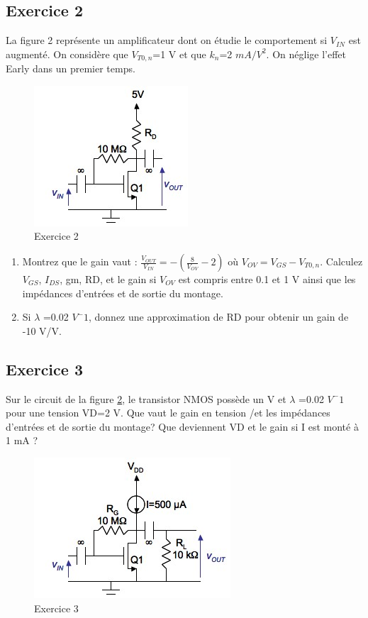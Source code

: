 \documentclass[paper=a4, fontsize=11pt]{article} %
\numberwithin{equation}{section} %
\numberwithin{figure}{section} %
\numberwithin{table}{section} %
\begin{document}
\subsection*{Exercice 2}
La figure 2 représente un amplificateur dont on étudie le comportement si $V_{IN}$ est augmenté. On considère que $V_{T0,n}$=1 V et que $k_n$=2 $mA/V^2$. On néglige l'effet Early dans un premier temps.
\begin{figure}[!htbp]
   \centering
   \includegraphics[]{figure/fig2-2.png}
   \caption{Exercice 2}
   \label{fig2-2}
\end{figure}
\begin{enumerate}
\item Montrez que le gain vaut : $\frac{V_{OUT}}{V_{IN}} = -\left(\frac{8}{V_{OV}}-2\right)$ où $V_{OV}=V_{GS}-V_{T0,n}$. Calculez $V_{GS}$, $I_{DS}$, gm, RD, et le gain si $V_{OV}$ est compris entre 0.1 et 1 V ainsi que les impédances d'entrées et de sortie du montage.
\item Si $\lambda$ =0.02 $V^-1$, donnez une approximation de RD pour obtenir un gain de -10 V/V.
\end{enumerate}
\subsection*{Exercice 3}
Sur le circuit de la figure \ref{fig2-3}, le transistor NMOS possède un  V et $\lambda$ =0.02 $V^-1$ pour une tension VD=2 V. Que vaut le gain en tension \vout/\vin et les impédances d'entrées et de sortie du montage? Que deviennent VD et le gain si I est monté à 1 mA ?
\begin{figure}[!htbp]
   \centering
   \includegraphics[]{figure/fig2-3.png}
   \caption{Exercice 3}
   \label{fig2-3}
\end{figure}
\end{document}
